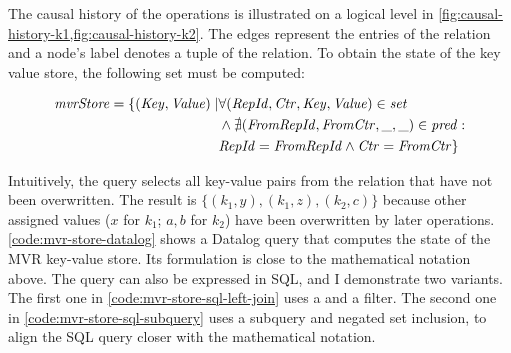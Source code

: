 

The causal history of the operations is illustrated on a logical level
in \ref{fig:causal-history-k1,fig:causal-history-k2}.
The edges represent the entries of the  relation and a node's
 label denotes a tuple of the 
relation.
To obtain the state of the key value store, the following set must be computed:

\begin{align*}
	\mathit{mvrStore} = \{ (\mathit{Key}, \mathit{Value}) \mid
	 & \forall (\mathit{RepId}, \mathit{Ctr}, \mathit{Key}, \mathit{Value}) \in \mathit{set}              \\
	 & \land \nexists (\mathit{FromRepId}, \mathit{FromCtr}, \mathit{\_}, \mathit{\_}) \in \mathit{pred}: \\
	 & \mathit{RepId} = \mathit{FromRepId} \land \mathit{Ctr} = \mathit{FromCtr} \}
\end{align*}

Intuitively, the query selects all key-value pairs from the  relation
that have not been overwritten.
The result is \(\{ (k_1, y), (k_1, z), (k_2, c)\}\) because other assigned values
(\(x\) for \(k_1\); \(a, b\) for \(k_2\)) have been overwritten by later operations.
\ref{code:mvr-store-datalog} shows a Datalog query that computes the state of the
\ac{MVR} key-value store.
Its formulation is close to the mathematical notation above.
The query can also be expressed in SQL, and I demonstrate two variants.
The first one in \ref{code:mvr-store-sql-left-join} uses a 
and a  filter.
The second one in \ref{code:mvr-store-sql-subquery} uses a subquery
and negated set inclusion, to align the SQL query closer with the mathematical
notation.

